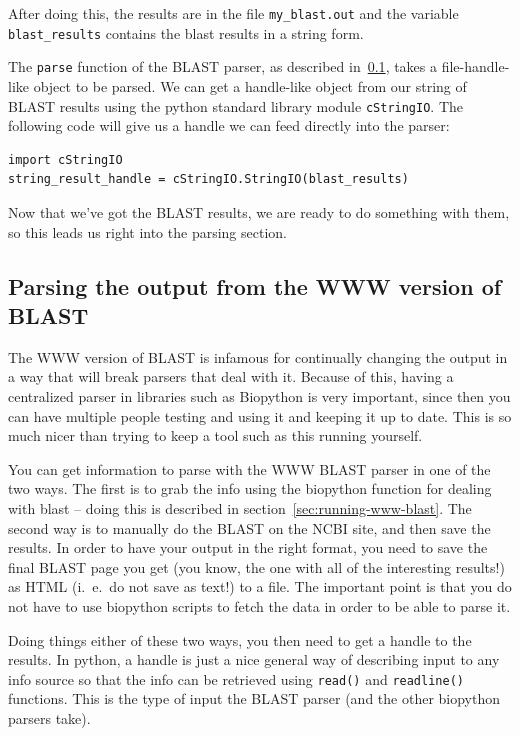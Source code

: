 \documentclass{report}
\begin{document}
After doing this, the results are in the file \verb|my_blast.out| and the
variable \verb|blast_results| contains the blast results in a string
form.


The \verb|parse| function of the BLAST parser, as described
in~\ref{sec:parsing-www-blast}, takes a file-handle-like object to be
parsed. We can get a handle-like object from our string of BLAST
results using the python standard library module \verb|cStringIO|. The 
following code will give us a handle we can feed directly into the
parser:

\begin{verbatim}
import cStringIO
string_result_handle = cStringIO.StringIO(blast_results)
\end{verbatim}


Now that we've got the BLAST results, we are ready to do
something with them, so this leads us right into the parsing section.

\subsection{Parsing the output from the WWW version of BLAST}
\label{sec:parsing-www-blast}

The WWW version of BLAST is infamous for continually
changing the output in a way that will break parsers that deal with
it. Because of this, having a centralized parser in libraries such as
Biopython is very important, since then you can have multiple people
testing and using it and keeping it up to date. This is so much nicer
than trying to keep a tool such as this running yourself.


You can get information to parse with the WWW BLAST parser in one of
the two ways. The first is to grab the info using the biopython
function for dealing with blast -- doing this is described in
section~\ref{sec:running-www-blast}. The 
second way is to manually do the BLAST on the NCBI site, and then save
the results. In order to have your output in the right format, you
need to save the final BLAST page you get (you know, the one with all
of the interesting results!) as HTML (i.~e.~do not save as text!) to a
file. The important point is that you do not have to use biopython
scripts to fetch the data in order to be able to parse it.


Doing things either of these two ways, you then need to get a handle
to the results. In python, a handle is just a nice general way of
describing input to any info source so that the info can be retrieved
using \verb|read()| and \verb|readline()| functions. This is the type
of input the BLAST parser (and the other biopython parsers take). 
\end{document}
